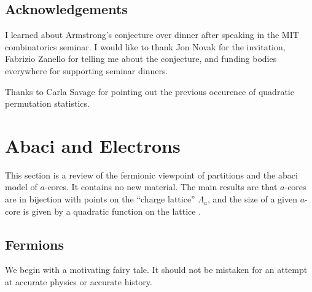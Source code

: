 \documentclass{amsart}[12pt]
\theoremstyle{definition}
\newtheorem{definition}[dummy]{Definition}
\newcommand{\Z}{\mathbb{Z}}
\newcommand{\R}{\mathbb{R}}
\begin{document}
\subsection{Acknowledgements}
I learned about Armstrong's conjecture over dinner after speaking in the MIT combinatorics seminar. I would like to thank Jon Novak for the invitation, Fabrizio Zanello for telling me about the conjecture, and funding bodies everywhere for supporting seminar dinners.  

Thanks to Carla Savage for pointing out the previous occurence of quadratic permutation statistics.








\section{Abaci and Electrons} \label{sec:abacus}

This section is a review of the fermionic viewpoint of partitions and the abaci model of $a$-cores.  It contains no new material.  The main results are that $a$-cores are in bijection with points on the ``charge lattice'' $\Lambda_a$, and the size of a given $a$-core is given by a quadratic function on the lattice
.


\subsection{Fermions}
 We begin with a motivating fairy tale. It should not be mistaken for an attempt at accurate physics or accurate history.
\end{document}
